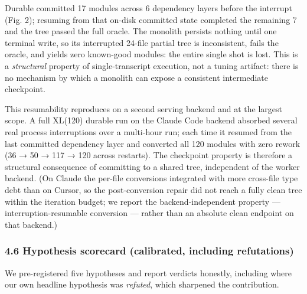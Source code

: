 \documentclass[
  10pt,
]{article}
\begin{document}
Durable committed 17 modules across 6 dependency layers before the
interrupt (Fig. 2); resuming from that on-disk committed state completed
the remaining 7 and the tree passed the full oracle. The monolith
persists nothing until one terminal write, so its interrupted 24-file
partial tree is inconsistent, fails the oracle, and yields zero
known-good modules: the entire single shot is lost. This is a
\emph{structural} property of single-transcript execution, not a tuning
artifact: there is no mechanism by which a monolith can expose a
consistent intermediate checkpoint.

This resumability reproduces on a second serving backend and at the
largest scope. A full XL(120) durable run on the Claude Code backend
absorbed several real process interruptions over a multi-hour run; each
time it resumed from the last committed dependency layer and converted
all 120 modules with zero rework (36 → 50 → 117 → 120 across restarts).
The checkpoint property is therefore a structural consequence of
committing to a shared tree, independent of the worker backend. (On
Claude the per-file conversions integrated with more cross-file type
debt than on Cursor, so the post-conversion repair did not reach a fully
clean tree within the iteration budget; we report the
backend-independent property --- interruption-resumable conversion ---
rather than an absolute clean endpoint on that backend.)

\subsubsection{4.6 Hypothesis scorecard (calibrated, including
refutations)}\label{hypothesis-scorecard-calibrated-including-refutations}

We pre-registered five hypotheses and report verdicts honestly,
including where our own headline hypothesis was \emph{refuted}, which
sharpened the contribution.
\end{document}
